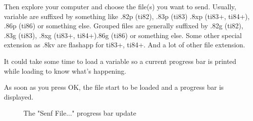 \documentclass[10pt]{report}
\begin{document}
Then explore your computer and choose the file(s) you want to send.\newline
Usually, variable are suffixed by something like .82p (ti82), .83p (ti83) .8xp (ti83+, ti84+), .86p (ti86) or something else.\newline
Grouped files are generally suffixed by .82g (ti82), .83g (ti83), .8xg (ti83+, ti84+).86g (ti86) or something else.\newline
Some other special extension as .8kv are flashapp for ti83+, ti84+.\newline
And a lot of other file extension.\newline

It could take some time to load a variable so a current progress bar is printed while loading to know what's happening.\newline

As soon as you press OK, the file start to be loaded and a progress bar is displayed.\newline

\begin{figure}[H]
\centering
{}
\caption{The "Senf File..." progress bar update}
\end{figure}
\end{document}
